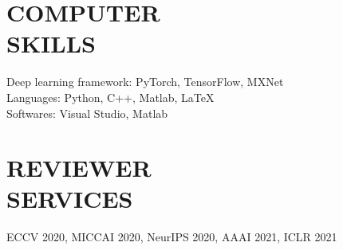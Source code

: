 \documentclass[margin]{res}
\begin{document}
\begin{resume}

\vspace{-1em}
\section{COMPUTER \\ SKILLS} 
                Deep learning framework: PyTorch, TensorFlow, MXNet\\
                Languages: Python, C++, Matlab, \LaTeX \\
                Softwares: Visual Studio, Matlab 

\vspace{-1em}
\section{REVIEWER \\ SERVICES}
                ECCV 2020, MICCAI 2020, NeurIPS 2020, AAAI 2021, ICLR 2021

\end{resume}
\end{document}
